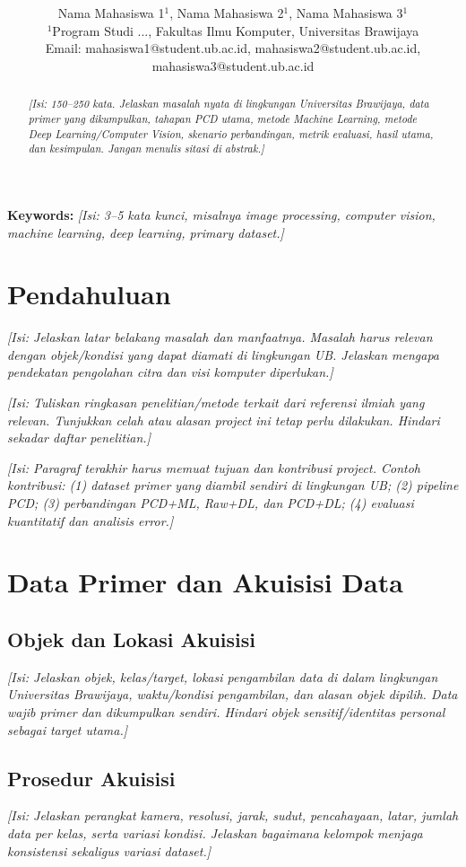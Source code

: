 \documentclass[10pt,twocolumn,a4paper]{article}
\title{\bfseries \projecttitle}
\author{
Nama Mahasiswa 1$^{1}$, Nama Mahasiswa 2$^{1}$, Nama Mahasiswa 3$^{1}$\\[-1mm]
\small $^{1}$Program Studi ..., Fakultas Ilmu Komputer, Universitas Brawijaya\\
\small Email: mahasiswa1@student.ub.ac.id, mahasiswa2@student.ub.ac.id, mahasiswa3@student.ub.ac.id
}
\date{}
\newcommand{\isian}[1]{\textcolor{notegray}{\textit{[Isi: #1]}}}
\begin{document}
\maketitle

\begin{abstract}
\isian{150--250 kata. Jelaskan masalah nyata di lingkungan Universitas Brawijaya, data primer yang dikumpulkan, tahapan PCD utama, metode Machine Learning, metode Deep Learning/Computer Vision, skenario perbandingan, metrik evaluasi, hasil utama, dan kesimpulan. Jangan menulis sitasi di abstrak.}
\end{abstract}

\noindent\textbf{Keywords:} \isian{3--5 kata kunci, misalnya image processing, computer vision, machine learning, deep learning, primary dataset.}

\section{Pendahuluan}
\isian{Jelaskan latar belakang masalah dan manfaatnya. Masalah harus relevan dengan objek/kondisi yang dapat diamati di lingkungan UB. Jelaskan mengapa pendekatan pengolahan citra dan visi komputer diperlukan.}

\isian{Tuliskan ringkasan penelitian/metode terkait dari referensi ilmiah yang relevan. Tunjukkan celah atau alasan project ini tetap perlu dilakukan. Hindari sekadar daftar penelitian.}

\isian{Paragraf terakhir harus memuat tujuan dan kontribusi project. Contoh kontribusi: (1) dataset primer yang diambil sendiri di lingkungan UB; (2) pipeline PCD; (3) perbandingan PCD+ML, Raw+DL, dan PCD+DL; (4) evaluasi kuantitatif dan analisis error.}

\section{Data Primer dan Akuisisi Data}
\subsection{Objek dan Lokasi Akuisisi}
\isian{Jelaskan objek, kelas/target, lokasi pengambilan data di dalam lingkungan Universitas Brawijaya, waktu/kondisi pengambilan, dan alasan objek dipilih. Data wajib primer dan dikumpulkan sendiri. Hindari objek sensitif/identitas personal sebagai target utama.}

\subsection{Prosedur Akuisisi}
\isian{Jelaskan perangkat kamera, resolusi, jarak, sudut, pencahayaan, latar, jumlah data per kelas, serta variasi kondisi. Jelaskan bagaimana kelompok menjaga konsistensi sekaligus variasi dataset.}
\end{document}
